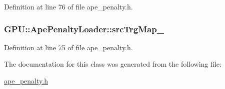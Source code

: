 Definition at line 76 of file ape\+\_\+penalty.\+h.

\subsubsection[{\texorpdfstring{src\+Trg\+Map\+\_\+}{srcTrgMap_}}]{ G\+P\+U\+::\+Ape\+Penalty\+Loader\+::src\+Trg\+Map\+\_\+\hspace{0.3cm}{\ttfamily [private]}}\hypertarget{classGPU_1_1ApePenaltyLoader_ad309bdbdb941461e1385667fd2cb00eb}{}\label{classGPU_1_1ApePenaltyLoader_ad309bdbdb941461e1385667fd2cb00eb}


Definition at line 75 of file ape\+\_\+penalty.\+h.



The documentation for this class was generated from the following file\+:\begin{DoxyCompactItemize}
\item 
\hyperlink{ape__penalty_8h}{ape\+\_\+penalty.\+h}\end{DoxyCompactItemize}

